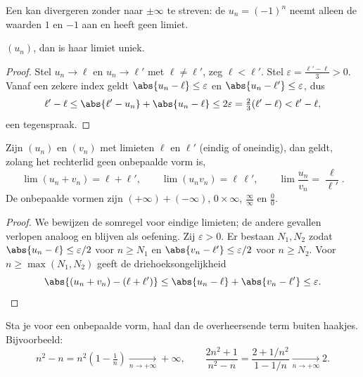 \begin{remark}
Een  kan divergeren zonder naar $\pm\infty$ te streven: de 
$u_n = (-1)^n$ neemt alleen de waarden $1$ en $-1$ aan en heeft geen limiet.
\end{remark}

\begin{proposition}\label{prop:g12:seq:uniqueness}
 $(u_n)$, dan is haar limiet uniek.
\end{proposition}

\begin{proof}
Stel $u_n \to \ell$ en $u_n \to \ell'$ met $\ell \neq \ell'$, zeg
$\ell < \ell'$. Stel $\varepsilon = \frac{\ell' - \ell}{3} > 0$. Vanaf een
zekere index geldt $\abs{u_n - \ell} \leq \varepsilon$ en
$\abs{u_n - \ell'} \leq \varepsilon$, dus
\[
\ell' - \ell \leq \abs{\ell' - u_n} + \abs{u_n - \ell}
\leq 2\varepsilon = \tfrac{2}{3}(\ell' - \ell) < \ell' - \ell,
\]
een tegenspraak.
\end{proof}

\begin{proposition}\label{prop:g12:seq:operations}
Zijn $(u_n)$ en $(v_n)$  met limieten $\ell$ en $\ell'$ (eindig of
oneindig), dan geldt, zolang het rechterlid geen onbepaalde vorm is,
\[
\lim (u_n + v_n) = \ell + \ell', \qquad
\lim (u_n v_n) = \ell\,\ell', \qquad
\lim \frac{u_n}{v_n} = \frac{\ell}{\ell'}.
\]
De onbepaalde vormen zijn $(+\infty) + (-\infty)$, $0 \times \infty$,
$\frac{\infty}{\infty}$ en $\frac{0}{0}$.
\end{proposition}

\begin{proof}
We bewijzen de somregel voor eindige limieten; de andere gevallen verlopen
analoog en blijven als oefening. Zij $\varepsilon > 0$. Er bestaan $N_1, N_2$
zodat $\abs{u_n - \ell} \leq \varepsilon/2$ voor $n \geq N_1$ en
$\abs{v_n - \ell'} \leq \varepsilon/2$ voor $n \geq N_2$. Voor
$n \geq \max(N_1, N_2)$ geeft de driehoeksongelijkheid
\[
\abs{(u_n + v_n) - (\ell + \ell')}
\leq \abs{u_n - \ell} + \abs{v_n - \ell'} \leq \varepsilon. \qedhere
\]
\end{proof}

\begin{method}\label{met:g12:seq:indeterminate}
Sta je voor een onbepaalde vorm, haal dan de overheersende term buiten
haakjes. Bijvoorbeeld:
\[
n^2 - n = n^2\left(1 - \tfrac{1}{n}\right) \xrightarrow[n\to+\infty]{} +\infty,
\qquad
\frac{2n^2+1}{n^2 - n} = \frac{2 + 1/n^2}{1 - 1/n}
\xrightarrow[n\to+\infty]{} 2 .
\]
\end{method}

